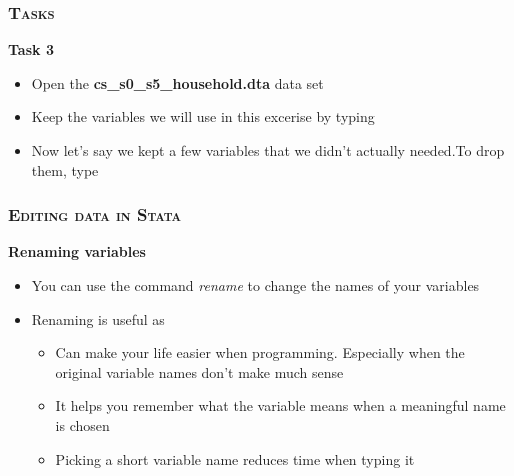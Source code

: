 \documentclass[10pt]{beamer}
\begin{document}
	\begin{frame}
		\frametitle{\textsc{Tasks}}
		\begin{center}
			\Large\textbf{Task 3}
		\end{center}
		\begin{itemize}
			\item Open the \textbf{cs\_s0\_s5\_household.dta} data set
		\end{itemize}
	
\begin{stlog}\end{stlog}
		\begin{itemize}
			\item Keep the variables we will use in this excerise by typing
		\end{itemize}
	
\begin{stlog}\end{stlog}
		\begin{itemize}
			\item Now let’s say we kept a few variables that we didn’t actually needed.To drop them, type
		\end{itemize}
	
\begin{stlog}\end{stlog}
	\end{frame}
	
	\begin{frame}
		\frametitle{\textsc{Editing data in Stata}}
		\begin{center}
			\Large\textbf{Renaming variables}
		\end{center}
		\begin{itemize}
			\item You can use the command \textit{rename} to change the names of your variables
			\item Renaming is useful as
			\begin{itemize}
				\item Can make your life easier when programming. Especially when the original variable names don’t make much sense
				\item It helps you remember what the variable means when a meaningful name is chosen
				\item Picking a short variable name reduces time when typing it
				
			\end{itemize}
		\end{itemize}
	\end{frame}
			
\end{document}
